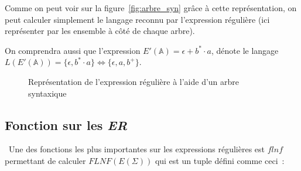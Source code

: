 \documentclass[12pt]{article}
\begin{document}
Comme on peut voir sur la figure~\ref{fig:arbre_syn} grâce à cette
représentation, on peut calculer simplement le langage reconnu par l'expression
régulière (ici représenter par les ensemble à côté de chaque arbre).

\vphantom{}

On comprendra aussi que l'expression \(E'(\mathbb{A}) = \epsilon + b^* \cdot
a\), dénote le langage \(L(E'(\mathbb{A})) = \{\epsilon, b^* \cdot a\}
\Leftrightarrow \{\epsilon, a, b^+\}\).

\begin{figure}[H]
    \centering
    \captionsetup{type=figure,justification=centering}
    \caption{
        Représentation de l'expression régulière à l'aide d'un arbre syntaxique
    }
\end{figure}

\subsection{Fonction sur les \textit{ER}}

\textbullet~Une des fonctions les plus importantes sur les expressions régulières
est \(flnf\) permettant de calculer \(FLNF(E(\Sigma))\) qui est un tuple défini
comme ceci~:
\end{document}
